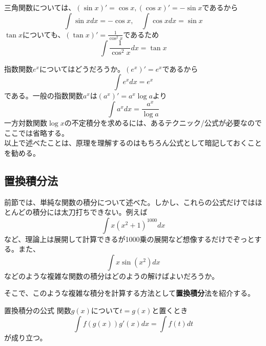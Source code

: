 \documentclass[a4j,dvipdfmx]{jsarticle}
\begin{document}
                三角関数については、$(\sin x)'=\cos x,(\cos x)'=-\sin x$であるから
                \begin{equation}
                    \int \sin xdx = -\cos x,\quad \int \cos x dx = \sin x \label{eq:sin,cosの積分}
                \end{equation}
                $\tan x$についても、$(\tan x)'=\frac{1}{\cos ^2x}$であるため
                \begin{equation}
                    \int \frac{1}{\cos^2 x}dx=\tan x \label{eq:tanの不定積分}
                \end{equation}

                指数関数$e^x$についてはどうだろうか。$(e^x)'=e^x$であるから
                \begin{equation}
                    \int e^x dx = e^x \label{eq:expの不定積分}
                \end{equation}
                である。一般の指数関数$a^x$は$(a^x)'=a^x \log a$より
                \begin{equation}
                    \int a^x dx =\frac{a^x}{\log a} \label{eq:a^xの不定積分}
                \end{equation}
                一方対数関数$\log x$の不定積分を求めるには、あるテクニック/公式が必要なのでここでは省略する。\\

                以上で述べたことは、原理を理解するのはもちろん公式として暗記しておくことを勧める。

            \clearpage
            \subsection{置換積分法}
                前節では、単純な関数の積分について述べた。しかし、これらの公式だけではほとんどの積分には太刀打ちできない。例えば
                \begin{equation*}
                    \int x(x^2+1)^{1000}dx
                \end{equation*}
                など、理論上は展開して計算できるが1000乗の展開など想像するだけでぞっとする。また、
                \begin{equation*}
                    \int x\sin(x^2)dx
                \end{equation*}
                などのような複雑な関数の積分はどのようの解けばよいだろうか。

                そこで、このような複雑な積分を計算する方法として\textbf{置換積分}法を紹介する。
                \begin{itembox}{置換積分の公式}
                    関数$g(x)$について$t=g(x)$と置くとき
                    \begin{equation}
                        \int f(g(x))g'(x)dx = \int f(t)dt \label{eq:置換積分}
                    \end{equation}
                    が成り立つ。
                \end{itembox}
\end{document}
